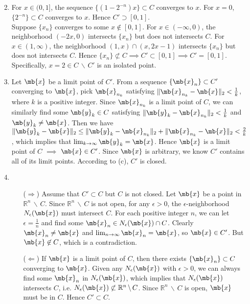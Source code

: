 \begin{exercise}
\begin{enumerate}
			\begin{solution}
				\begin{enumerate}
					\item []
					\item For $x \in (0,1]$, the sequence $\{(1-2^{-n})x\}\subset C$ converges to $x$.
						For $x=0$, $\{2^{-n}\}\subset C$ converges to $x$. Hence $C' \supset [0,1]$. \\
						Suppose $\{x_n\}$ converges to some $x \not\in [0,1]$.
						For $x \in (-\infty,0)$, the neighborhood $(-2x,0)$ intersects $\{x_n\}$ but does not intersects $C$.
						For $x \in (1,\infty)$, the neighborhood $(1,x)\cap(x,2x-1)$ intersects $\{x_n\}$ but does not intersects $C$.
						Hence $\{x_n\}\not\subset C \implies C' \subset [0,1] \implies  C' = [0,1]$. \\
						Specifically, $x=2\in C\,\backslash\,C'$ is an isolated point.
					\item Let $\mb{x}$ be a limit point of $C'$.
						From a sequence $\{\mb{x}_n\}\subset C'$ converging to $\mb{x}$, pick $\mb{x}_{n_k}$ satisfying $\|\mb{x}_{n_k}-\mb{x}\|_2 < \frac{1}{k}$, where $k$ is a positive integer.
						Since $\mb{x}_{n_k}$ is a limit point of $C$, we can similarly find some $\mb{y}_k \in C$ satisfying $\|\mb{y}_k-\mb{x}_{n_k}\|_2 < \frac{1}{k}$ and $\mb{y}_k\neq \mb{x}$.
						Then we have $\|\mb{y}_k-\mb{x}\|_2 \le \|\mb{y}_k-\mb{x}_{n_k}\|_2 + \|\mb{x}_{n_k}-\mb{x}\|_2 < \frac{2}{k}$, which implies that $\lim_{k\to \infty}\mb{y}_k = \mb{x}$.
						Hence $\mb{x}$ is a limit point of $C$ $\implies$ $\mb{x} \in C'$.
						Since $\mb{x}$ is arbitrary, we know $C'$ contains all of its limit points.
						According to (c), $C'$ is closed.
					\item %
						\begin{itemize}
							\item [($\Rightarrow$)]
								Assume that $C' \subset C$ but $C$ is not closed.
								Let $\mb{x}$ be a point in $\mathbb{R}^n\,\backslash\,C$.
								Since $\mathbb{R}^n\,\backslash\,C$ is not open, for any $\epsilon>0$, the $\epsilon$-neighborhood $N_\epsilon(\mb{x})$ must intersect $C$.
								For each positive integer $n$, we can let $\epsilon=\frac{1}{n}$ and find some $\mb{x}_n \in N_\epsilon(\mb{x})\cap C$.
								Clearly $\mb{x}_n \neq \mb{x}$ and $\lim_{n\to\infty}\mb{x}_n=\mb{x}$, so $\mb{x}\in C'$.
								But $\mb{x}\not\in C$, which is a contradiction.
							\item [($\Leftarrow$)]
								If $\mb{x}$ is a limit point of $C$, then there exists $\{\mb{x}_n\}\subset C$ converging to $\mb{x}$.
								Given any $N_\epsilon(\mb{x})$ with $\epsilon>0$, we can always find some $\mb{x}_n$ in $N_\epsilon(\mb{x})$, which implies that $N_\epsilon(\mb{x})$ intersects $C$, i.e. $N_\epsilon(\mb{x})\not\subset \mathbb{R}^n\,\backslash\,C$.
								Since $\mathbb{R}^n\,\backslash\,C$ is open, $\mb{x}$ must be in $C$.
								Hence $C' \subset C$.
								\qedhere
						\end{itemize}
				\end{enumerate}
			\end{solution}


\end{enumerate}
\end{exercise}
